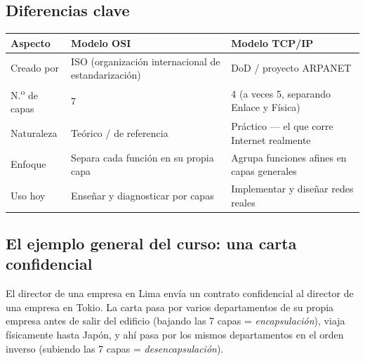 \documentclass[11pt,a4paper]{article}
\begin{document}
\subsection*{Diferencias clave}
\begin{center}
\small
\begin{tabularx}{\textwidth}{@{}l X X@{}}
\toprule
\textbf{Aspecto} & \textbf{Modelo OSI} & \textbf{Modelo TCP/IP} \\
\midrule
Creado por & ISO (organización internacional de estandarización) & DoD / proyecto ARPANET \\
N.\textsuperscript{o} de capas & 7 & 4 (a veces 5, separando Enlace y Física) \\
Naturaleza & Teórico / de referencia & Práctico --- el que corre Internet realmente \\
Enfoque & Separa cada función en su propia capa & Agrupa funciones afines en capas generales \\
Uso hoy & Enseñar y diagnosticar por capas & Implementar y diseñar redes reales \\
\bottomrule
\end{tabularx}
\end{center}

\subsection*{El ejemplo general del curso: una carta confidencial}
\begin{analogybox}
El director de una empresa en Lima envía un contrato confidencial al director de una empresa en Tokio. La carta pasa por varios departamentos de su propia empresa antes de salir del edificio (bajando las 7 capas = \textit{encapsulación}), viaja físicamente hasta Japón, y ahí pasa por los mismos departamentos en el orden inverso (subiendo las 7 capas = \textit{desencapsulación}).
\end{analogybox}
\end{document}
